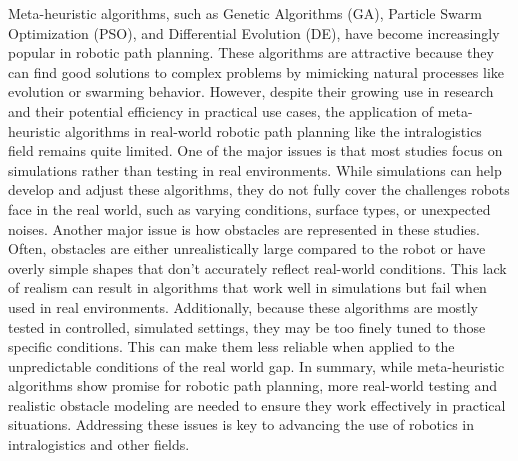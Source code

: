 
Meta-heuristic algorithms, such as Genetic Algorithms (GA), Particle Swarm Optimization (PSO), and Differential 
Evolution (DE), have become increasingly popular in robotic path planning. These algorithms are attractive because 
they can find good solutions to complex problems by mimicking natural processes like evolution or swarming behavior.
However, despite their growing use in research and their potential efficiency in practical use cases, the application 
of meta-heuristic algorithms in real-world robotic path planning like the intralogistics field remains quite limited. 
One of the major issues is that most studies focus on simulations rather than 
testing in real environments. While simulations can help develop and adjust these algorithms, they do not fully 
cover the challenges robots face in the real world, such as varying conditions, surface types, or unexpected 
noises. Another major issue is how obstacles are represented in these studies. Often, obstacles are either unrealistically 
large compared to the robot or have overly simple shapes that don’t accurately reflect real-world conditions. This 
lack of realism can result in algorithms that work well in simulations but fail when used in real environments. Additionally, 
because these algorithms are mostly tested in controlled, simulated settings, they may be too finely 
tuned to those specific conditions. This can make them less reliable when applied to the unpredictable conditions 
of the real world gap. In summary, while meta-heuristic algorithms show promise for robotic path planning, more real-world 
testing and realistic obstacle modeling are needed to ensure they work effectively in practical situations. 
Addressing these issues is key to advancing the use of robotics in intralogistics and other fields.
\newpage
